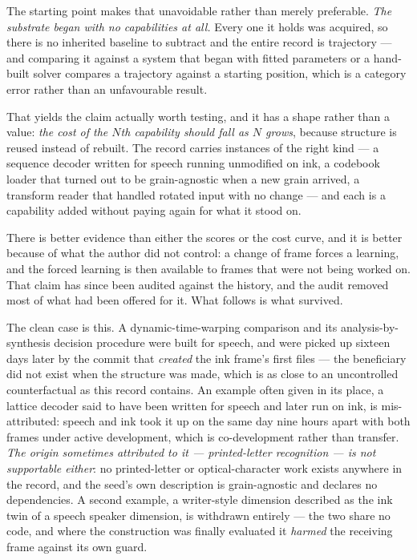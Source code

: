 \documentclass[11pt,a4paper]{article}
\begin{document}
The starting point makes that unavoidable rather than merely preferable. \emph{The substrate began with
no capabilities at all.} Every one it holds was acquired, so there is no inherited baseline to subtract
and the entire record is trajectory --- and comparing it against a system that began with fitted
parameters or a hand-built solver compares a trajectory against a starting position, which is a
category error rather than an unfavourable result.

That yields the claim actually worth testing, and it has a shape rather than a value:
\emph{the cost of the $N$th capability should fall as $N$ grows}, because structure is reused instead
of rebuilt. The record carries instances of the right kind --- a sequence decoder written for speech
running unmodified on ink, a codebook loader that turned out to be grain-agnostic when a new grain
arrived, a transform reader that handled rotated input with no change --- and each is a capability
added without paying again for what it stood on.

There is better evidence than either the scores or the cost curve, and it is better because of what
the author did not control: a change of frame forces a learning, and the forced learning is then
available to frames that were not being worked on. That claim has since been audited against the
history, and the audit removed most of what had been offered for it. What follows is what survived.

The clean case is this. A dynamic-time-warping comparison and its
analysis-by-synthesis decision procedure were built for speech, and were picked up sixteen days later
by the commit that \emph{created} the ink frame's first files --- the beneficiary did not exist when
the structure was made, which is as close to an uncontrolled counterfactual as this record contains.
An example often given in its place, a lattice decoder said to have been written for speech and
later run on ink, is mis-attributed: speech and ink took it up on the same day nine hours apart with
both frames under active development, which is co-development rather than transfer. \emph{The origin
sometimes attributed to it --- printed-letter recognition --- is not supportable either}: no printed-letter or optical-character work exists anywhere in the record, and the
seed's own description is grain-agnostic and declares no dependencies. A second example, a writer-style dimension described as the ink
twin of a speech speaker dimension, is withdrawn entirely --- the two share no code, and where the
construction was finally evaluated it \emph{harmed} the receiving frame against its own guard.
\end{document}
